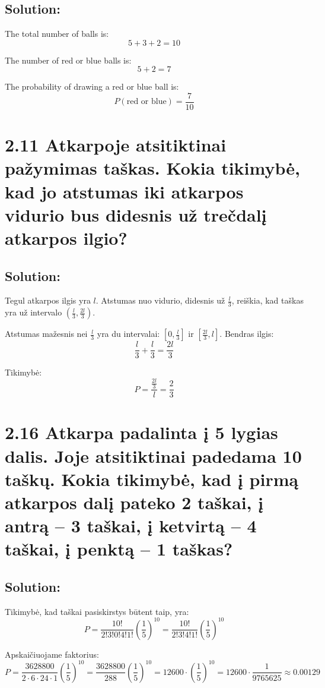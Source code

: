 \documentclass{article}
\begin{document}
{\subsection*{Solution:}
The total number of balls is:
\[
5 + 3 + 2 = 10
\]

The number of red or blue balls is:
\[
5 + 2 = 7
\]

The probability of drawing a red or blue ball is:
\[
P(\text{red or blue}) = \frac{7}{10}
\]

\section*{2.11 Atkarpoje atsitiktinai pažymimas taškas. Kokia tikimybė, kad jo atstumas iki atkarpos vidurio bus didesnis už trečdalį atkarpos ilgio?}

\subsection*{Solution:}
Tegul atkarpos ilgis yra \(l\). Atstumas nuo vidurio, didesnis už \(\frac{l}{3}\), reiškia, kad taškas yra už intervalo \(\left(\frac{l}{3}, \frac{2l}{3}\right)\).

Atstumas mažesnis nei \(\frac{l}{3}\) yra du intervalai: \(\left[0, \frac{l}{3}\right]\) ir \(\left[\frac{2l}{3}, l\right]\). Bendras ilgis:
\[
\frac{l}{3} + \frac{l}{3} = \frac{2l}{3}
\]

Tikimybė:
\[
P = \frac{\frac{2l}{3}}{l} = \frac{2}{3}
\]

\section*{2.16 Atkarpa padalinta į 5 lygias dalis. Joje atsitiktinai padedama 10 taškų. Kokia tikimybė, kad į pirmą atkarpos dalį pateko 2 taškai, į antrą – 3 taškai, į ketvirtą – 4 taškai, į penktą – 1 taškas?}

\subsection*{Solution:}
Tikimybė, kad taškai pasiskirstys būtent taip, yra:
\[
P = \frac{10!}{2!3!0!4!1!} \left(\frac{1}{5}\right)^{10} = \frac{10!}{2!3!4!1!} \left(\frac{1}{5}\right)^{10}
\]

Apskaičiuojame faktorius:
\[
P = \frac{3628800}{2 \cdot 6 \cdot 24 \cdot 1} \left(\frac{1}{5}\right)^{10} = \frac{3628800}{288} \left(\frac{1}{5}\right)^{10} = 12600 \cdot \left(\frac{1}{5}\right)^{10} = 12600 \cdot \frac{1}{9765625} \approx 0.00129
\]

}
\end{document}

